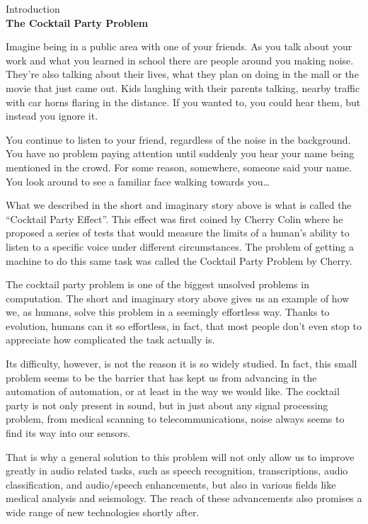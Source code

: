 \documentclass{article}
\begin{document}
\begin{center}
\LARGE
Introduction\\
\vspace{0.5cm}
\large
\textbf{The Cocktail Party Problem}\\
\normalsize
\end{center}

Imagine being in a public area with one of your friends. As you talk about your work and what you learned in school there are people around you making noise. They’re also talking about their lives, what they plan on doing in the mall or the movie that just came out. Kids laughing with their parents talking, nearby traffic with car horns flaring in the distance. If you wanted to, you could hear them, but instead you ignore it.
\par
You continue to listen to your friend, regardless of the noise in the background. You have no problem paying attention until suddenly you hear your name being mentioned in the crowd. For some reason, somewhere, someone said your name. You look around to see a familiar face walking towards you…
\par
What we described in the short and imaginary story above is what is called the “Cocktail Party Effect”. This effect was first coined by Cherry Colin\cite{Cherry} where he proposed a series of tests that would measure the limits of a human’s ability to listen to a specific voice under different circumstances. The problem of getting a machine to do this same task was called the Cocktail Party Problem by Cherry.
\par
The cocktail party problem is one of the biggest unsolved problems in computation. The short and imaginary story above gives us an example of how we, as humans, solve this problem in a seemingly effortless way. Thanks to evolution, humans can it so effortless, in fact, that most people don’t even stop to appreciate how complicated the task actually is.
\par
Its difficulty, however, is not the reason it is so widely studied. In fact, this small problem seems to be the barrier that has kept us from advancing in the automation of automation, or at least in the way we would like. The cocktail party is not only present in sound, but in just about any signal processing problem, from medical scanning to telecommunications\cite{CocktailPartyProblemRevisit}, noise always seems to find its way into our sensors.
\par
That is why a general solution to this problem will not only allow us to improve greatly in audio related tasks, such as speech recognition, transcriptions, audio classification, and audio/speech enhancements, but also in various fields like medical analysis and seismology. The reach of these advancements also promises a wide range of new technologies shortly after.
\end{document}
